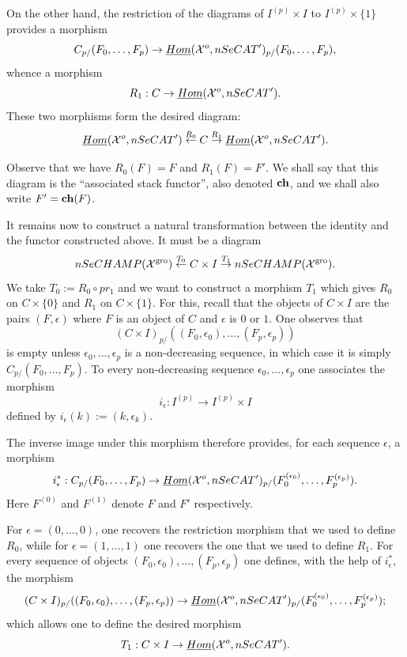 On the other hand, the restriction of the diagrams of $I^{(p)}\times I$ to
$I^{(p)}\times \{ 1\}$ provides a morphism
$$
C_{p/}(F_0,\ldots , F_p)\rightarrow\underline{Hom}({\cal X}
^o,nSeCAT')_{p/}(F_0,\ldots , F_p),
$$
whence a morphism
$$
R_1: C\rightarrow \underline{Hom}({\cal X} ^o,nSeCAT').
$$
These two morphisms form the desired diagram:
$$
\underline{Hom}({\cal X} ^o,nSeCAT')
\stackrel{R_0}{\leftarrow}C
\stackrel{R_1}{\rightarrow}\underline{Hom}({\cal X} ^o,nSeCAT').
$$


Observe that we have $R_0(F)=F$ and $R_1(F)=F'$.
We shall say that this diagram is the ``associated stack functor'',
also denoted ${\bf ch}$,
and we shall also write $F'= {\bf ch}(F)$.


It remains now to construct a natural transformation
between the identity and the functor constructed above. It
must be a diagram
$$
nSeCHAMP({\cal X} ^{\rm gro})\stackrel{T_0}{\leftarrow} C\times I
\stackrel{T_1}{\rightarrow}
nSeCHAMP({\cal X} ^{\rm gro}).
$$
We take $T_0:= R_0\circ pr_1$ and we want to construct a morphism $T_1$
which gives $R_0$ on $C\times \{ 0\}$ and $R_1$ on $C\times \{ 1\}$.
For this,
recall that the objects of $C\times I$ are the pairs $(F,\epsilon
)$ where $F$ is an object of $C$ and $\epsilon$ is $0$ or $1$. One
observes that
$$
(C\times I)_{p/}((F_0,\epsilon _0),\ldots , (F_p, \epsilon _p))
$$
is empty unless $\epsilon _0,\ldots , \epsilon _p$ is a
non-decreasing sequence, in which case it is simply
$C_{p/}(F_0,\ldots , F_p)$. To every non-decreasing sequence $\epsilon
_0,\ldots , \epsilon _p$ one associates the morphism
$$
i_{\epsilon} :I^{(p)}\rightarrow I^{(p)}\times I
$$
defined by $ i_{\epsilon}(k):= (k, \epsilon _k)$.

The inverse image under this morphism
therefore provides, for each sequence $\epsilon$, a morphism
$$
i_{\epsilon}^{\ast}: C_{p/}(F_0,\ldots , F_p)\rightarrow \underline{Hom}({\cal X}
^o,nSeCAT')_{p/}(F_0^{(\epsilon _0)},\ldots , F_p^{(\epsilon _p)} ).
$$
Here $F^{(0)}$ and $F^{(1)}$ denote
$F$ and $F'$ respectively.

For $\epsilon = (0,\ldots , 0)$,
one recovers the restriction morphism that we
used to define $R_0$, while
for $\epsilon =(1,\ldots , 1)$ one recovers the one that we
used to define $R_1$. For every sequence
of objects $(F_0,\epsilon _0),\ldots , (F_p, \epsilon _p)$ one
defines, with the help
of $i_{\epsilon}^{\ast}$, the morphism
$$
(C\times I)_{p/}((F_0,\epsilon _0),\ldots , (F_p, \epsilon _p))\rightarrow
\underline{Hom}({\cal X}
^o,nSeCAT')_{p/}(F_0^{(\epsilon _0)},\ldots , F_p^{(\epsilon _p)} );
$$
which allows one to define the desired morphism
$$
T_1: C\times I \rightarrow \underline{Hom}({\cal X}
^o,nSeCAT').
$$

